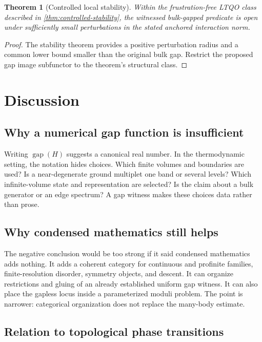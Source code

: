 \documentclass[12pt]{article}
\newtheorem{theorem}{Theorem}[section]
\theoremstyle{definition}
\theoremstyle{remark}
\begin{document}
\begin{theorem}[Controlled local stability]
Within the frustration-free LTQO class described in
\cref{thm:controlled-stability}, the witnessed bulk-gapped predicate is open
under sufficiently small perturbations in the stated anchored interaction
norm.
\end{theorem}

\begin{proof}
The stability theorem provides a positive perturbation radius and a common
lower bound smaller than the original bulk gap. Restrict the proposed gap
image subfunctor to the theorem's structural class.
\end{proof}

\section{Discussion}

\subsection{Why a numerical gap function is insufficient}

Writing $\operatorname{gap}(H)$ suggests a canonical real number. In the
thermodynamic setting, the notation hides choices. Which finite volumes and
boundaries are used? Is a near-degenerate ground multiplet one band or several
levels? Which infinite-volume state and representation are selected? Is the
claim about a bulk generator or an edge spectrum? A gap witness makes these
choices data rather than prose.

\subsection{Why condensed mathematics still helps}

The negative conclusion would be too strong if it said condensed mathematics
adds nothing. It adds a coherent category for continuous and profinite
families, finite-resolution disorder, symmetry objects, and descent. It can
organize restrictions and gluing of an already established uniform gap
witness. It can also place the gapless locus inside a parameterized moduli
problem. The point is narrower: categorical organization does not replace the
many-body estimate.

\subsection{Relation to topological phase transitions}
\end{document}
